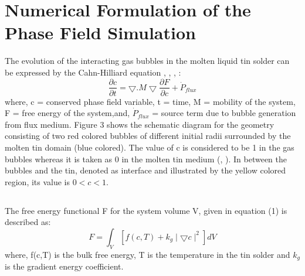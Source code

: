 \documentclass[10pt,a4paper]{article}
\begin{document}
\section{Numerical Formulation of the Phase Field Simulation}
The evolution of the interacting gas bubbles in the molten liquid tin solder can be expressed by the Cahn-Hilliard equation \cite{6}, \citep{7}, \citep{8}, \cite{9}  :
\begin{equation}
\frac{\partial c}{\partial t} = \bigtriangledown . M \bigtriangledown \frac{\partial F}{\partial c} + \dot P_{flux}
\end{equation}
 where, 
 c = conserved phase field variable,
 t = time,
 M = mobility of the system, 
 F = free energy of the system,and,
 $\dot P_{flux}$ = source term due to bubble generation from flux medium.
Figure 3 shows the schematic diagram for the geometry consisting of   two red colored bubbles of different initial radii surrounded by the molten tin domain (blue colored). The value of c is considered to be 1 in the gas bubbles whereas it is taken as 0 in the molten tin medium (\cite{10}, \cite{11}). In between the bubbles and the tin, denoted as interface and illustrated by the yellow colored region, its value is $0 < c < 1$.
\subsection*{}
The free energy functional F for the system volume V, given in equation (1) is described as:
\begin{equation}
F = \int_V [f(c,T) + k_{g} \mid \bigtriangledown c \mid ^2] dV  
\end{equation}
where, f(c,T) is the bulk free energy, T  is the temperature in the tin solder and $k_{g}$ is the gradient energy coefficient.
\end{document}
